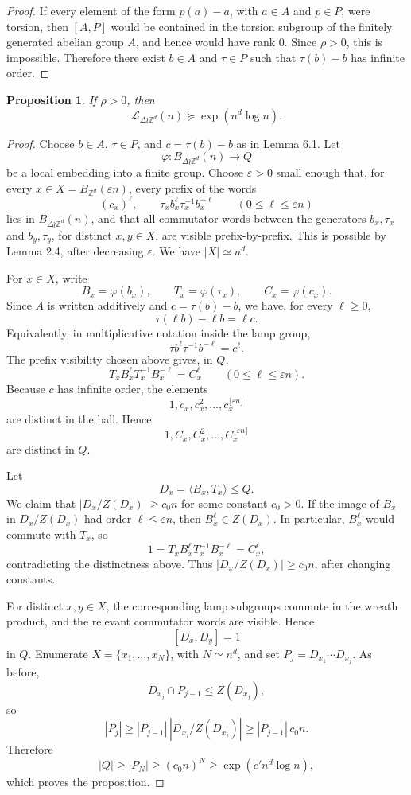 \documentclass[11pt]{article}
\newcommand{\LEF}{\mathcal L}
\newcommand{\Z}{\mathbb Z}
\newtheorem{proposition}[theorem]{Proposition}
\begin{document}
\begin{proof}
If every element of the form \(p(a)-a\), with \(a\in A\) and \(p\in P\), were torsion, then \([A,P]\) would be contained in the torsion subgroup of the finitely generated abelian group \(A\), and hence would have rank \(0\). Since \(\rho>0\), this is impossible. Therefore there exist \(b\in A\) and \(\tau\in P\) such that \(\tau(b)-b\) has infinite order.
\end{proof}

\begin{proposition}
If \(\rho>0\), then
\[
\LEF_{\Delta\wr\Z^d}(n)\succeq \exp(n^d\log n).
\]
\end{proposition}

\begin{proof}
Choose \(b\in A\), \(\tau\in P\), and \(c=\tau(b)-b\) as in Lemma 6.1. Let
\[
\varphi:B_{\Delta\wr\Z^d}(n)\to Q
\]
be a local embedding into a finite group. Choose \(\varepsilon>0\) small enough that, for every \(x\in X=B_{\Z^d}(\varepsilon n)\), every prefix of the words
\[
(c_x)^\ell,\qquad \tau_x b_x^\ell\tau_x^{-1}b_x^{-\ell}\qquad (0\le \ell\le \varepsilon n)
\]
lies in \(B_{\Delta\wr\Z^d}(n)\), and that all commutator words between the generators \(b_x,\tau_x\) and \(b_y,\tau_y\), for distinct \(x,y\in X\), are visible prefix-by-prefix. This is possible by Lemma 2.4, after decreasing \(\varepsilon\). We have \(|X|\simeq n^d\).

For \(x\in X\), write
\[
B_x=\varphi(b_x),\qquad T_x=\varphi(\tau_x),\qquad C_x=\varphi(c_x).
\]
Since \(A\) is written additively and \(c=\tau(b)-b\), we have, for every \(\ell\ge 0\),
\[
\tau(\ell b)-\ell b=\ell c.
\]
Equivalently, in multiplicative notation inside the lamp group,
\[
\tau b^\ell\tau^{-1}b^{-\ell}=c^\ell.
\]
The prefix visibility chosen above gives, in \(Q\),
\[
T_xB_x^\ell T_x^{-1}B_x^{-\ell}=C_x^\ell\qquad (0\le \ell\le \varepsilon n).
\]
Because \(c\) has infinite order, the elements
\[
1,c_x,c_x^2,\ldots,c_x^{\lfloor\varepsilon n\rfloor}
\]
are distinct in the ball. Hence
\[
1,C_x,C_x^2,\ldots,C_x^{\lfloor\varepsilon n\rfloor}
\]
are distinct in \(Q\).

Let
\[
D_x=\langle B_x,T_x\rangle\le Q.
\]
We claim that \(|D_x/Z(D_x)|\ge c_0n\) for some constant \(c_0>0\). If the image of \(B_x\) in \(D_x/Z(D_x)\) had order \(\ell\le \varepsilon n\), then \(B_x^\ell\in Z(D_x)\). In particular, \(B_x^\ell\) would commute with \(T_x\), so
\[
1=T_xB_x^\ell T_x^{-1}B_x^{-\ell}=C_x^\ell,
\]
contradicting the distinctness above. Thus \(|D_x/Z(D_x)|\ge c_0n\), after changing constants.

For distinct \(x,y\in X\), the corresponding lamp subgroups commute in the wreath product, and the relevant commutator words are visible. Hence
\[
[D_x,D_y]=1
\]
in \(Q\). Enumerate \(X=\{x_1,\ldots,x_N\}\), with \(N\simeq n^d\), and set \(P_j=D_{x_1}\cdots D_{x_j}\). As before,
\[
D_{x_j}\cap P_{j-1}\le Z(D_{x_j}),
\]
so
\[
|P_j|\ge |P_{j-1}|\,|D_{x_j}/Z(D_{x_j})|\ge |P_{j-1}|\,c_0n.
\]
Therefore
\[
|Q|\ge |P_N|\ge (c_0n)^N\ge \exp(c'n^d\log n),
\]
which proves the proposition.
\end{proof}
\end{document}
